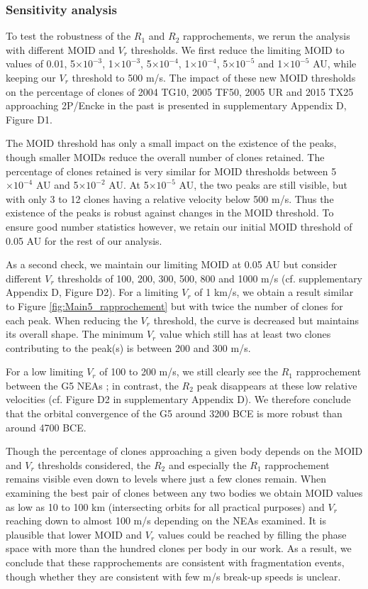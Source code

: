 \documentclass[letters,a4paper,fleqn,usenatbib]{mnras}
\begin{document}
  \subsubsection{Sensitivity analysis}

 To test the robustness of the $R_1$ and $R_2$ rapprochements, we rerun the analysis with different MOID and $V_r$ thresholds. We first reduce the limiting MOID to values of 0.01, 5$\times10^{-3}$, 1$\times10^{-3}$, 5$\times10^{-4}$, 1$\times10^{-4}$, 5$\times10^{-5}$ and 1$\times10^{-5}$ AU, while keeping our $V_r$ threshold to 500 m/s. The impact of these new MOID thresholds on the percentage of clones of 2004 TG10, 2005 TF50, 2005 UR and 2015 TX25 approaching 2P/Encke in the past is presented in supplementary Appendix D, Figure D1.
 
 The MOID threshold has only a small impact on the existence of the peaks, though smaller MOIDs reduce the overall number of clones retained. The percentage of clones retained is very similar for MOID thresholds between 5$\times10^{-4}$ AU and 5$\times10^{-2}$ AU. At 5$\times10^{-5}$ AU, the two peaks are still visible, but with only 3 to 12 clones having a relative velocity below 500 m/s. Thus the existence of the peaks is robust against changes in the MOID threshold. To ensure good number statistics however, we retain our initial MOID threshold of 0.05 AU for the rest of our analysis. 
 
 As a second check, we maintain our limiting MOID at 0.05 AU but consider different $V_r$ thresholds of 100, 200, 300, 500, 800 and 1000 m/s (cf. supplementary Appendix D, Figure D2). For a limiting $V_r$ of 1 km/s, we obtain a result similar to Figure \ref{fig:Main5_rapprochement} but with twice the number of clones for each peak. When reducing the $V_r$ threshold, the curve is decreased but maintains its overall shape. The minimum $V_r$ value which still has at least two clones contributing to the peak(s) is between 200 and 300 m/s. 
 
 For a low limiting $V_r$ of 100 to 200 m/s, we still clearly see the $R_1$ rapprochement between the G5 NEAs ; in contrast, the $R_2$ peak disappears at these low relative velocities (cf. Figure D2 in supplementary Appendix D). We therefore conclude that the orbital convergence of the G5 around 3200 BCE is more robust than around 4700 BCE. 
 
Though the percentage of clones approaching a given body depends on the MOID and $V_r$ thresholds considered, the $R_2$ and especially the $R_1$ rapprochement remains visible even down to levels where just a few clones remain. When examining the best pair of clones between any two bodies we obtain MOID values as low as 10 to 100 km (intersecting orbits for all practical purposes) and $V_r$ reaching down to almost 100 m/s depending on the NEAs examined. It is plausible that lower MOID and $V_r$ values could be reached by filling the phase space with more than the hundred clones per body in our work. As a result, we conclude that these rapprochements are consistent with fragmentation events, though whether they are consistent with few m/s break-up speeds is unclear.
 
\end{document}
